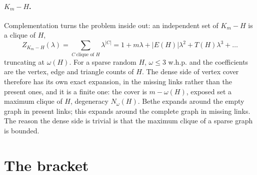 \documentclass[11pt]{article}
\begin{document}
\paragraph{$K_m-H$.} Complementation turns the problem inside out: an
independent set of $K_m-H$ is a clique of $H$,
\begin{equation}
  Z_{K_m-H}(\lambda)=\sum_{C\ \text{clique of }H}\lambda^{|C|}
  =1+m\lambda+|E(H)|\lambda^2+T(H)\lambda^3+\dots
  \label{eq:cliquepoly}
\end{equation}
truncating at $\omega(H)$. For a sparse random $H$, $\omega\le3$ w.h.p. and
the coefficients are the vertex, edge and triangle counts of $H$. The dense
side of vertex cover therefore has its own exact expansion, in the missing
links rather than the present ones, and it is a finite one: the cover is
$m-\omega(H)$, exposed set a maximum clique of $H$, degeneracy $N_\omega(H)$.
Bethe expands around the empty graph in present links; this expands around the
complete graph in missing links. The reason the dense side is trivial is that
the maximum clique of a sparse graph is bounded.

\section{The bracket}
\end{document}

